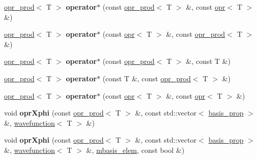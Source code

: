 \begin{DoxyCompactItemize}
\mbox{\label{classqbasis_1_1opr__prod_a9394cae1fbe6e42a475d575ceac997c0}} 
\hyperlink{classqbasis_1_1opr__prod}{opr\+\_\+prod}$<$ T $>$ {\bfseries operator$\ast$} (const \hyperlink{classqbasis_1_1opr__prod}{opr\+\_\+prod}$<$ T $>$ \&, const \hyperlink{classqbasis_1_1opr}{opr}$<$ T $>$ \&)
\item 
\mbox{\label{classqbasis_1_1opr__prod_a9287c2be3de2087fdcced88eb0436490}} 
\hyperlink{classqbasis_1_1opr__prod}{opr\+\_\+prod}$<$ T $>$ {\bfseries operator$\ast$} (const \hyperlink{classqbasis_1_1opr}{opr}$<$ T $>$ \&, const \hyperlink{classqbasis_1_1opr__prod}{opr\+\_\+prod}$<$ T $>$ \&)
\item 
\mbox{\label{classqbasis_1_1opr__prod_a3e2cec7ffd88716c062ccdaef262aaef}} 
\hyperlink{classqbasis_1_1opr__prod}{opr\+\_\+prod}$<$ T $>$ {\bfseries operator$\ast$} (const \hyperlink{classqbasis_1_1opr__prod}{opr\+\_\+prod}$<$ T $>$ \&, const T \&)
\item 
\mbox{\label{classqbasis_1_1opr__prod_a9919cd114d5108bf4eea92e78f7c4827}} 
\hyperlink{classqbasis_1_1opr__prod}{opr\+\_\+prod}$<$ T $>$ {\bfseries operator$\ast$} (const T \&, const \hyperlink{classqbasis_1_1opr__prod}{opr\+\_\+prod}$<$ T $>$ \&)
\item 
\mbox{\label{classqbasis_1_1opr__prod_a11b6241378ef451b125f70513f22fc8c}} 
\hyperlink{classqbasis_1_1opr__prod}{opr\+\_\+prod}$<$ T $>$ {\bfseries operator$\ast$} (const \hyperlink{classqbasis_1_1opr}{opr}$<$ T $>$ \&, const \hyperlink{classqbasis_1_1opr}{opr}$<$ T $>$ \&)
\item 
\mbox{\label{classqbasis_1_1opr__prod_a1fe392ded4e181e14304fd0b5c03e5bf}} 
void {\bfseries opr\+Xphi} (const \hyperlink{classqbasis_1_1opr__prod}{opr\+\_\+prod}$<$ T $>$ \&, const std\+::vector$<$ \hyperlink{classqbasis_1_1basis__prop}{basis\+\_\+prop} $>$ \&, \hyperlink{classqbasis_1_1wavefunction}{wavefunction}$<$ T $>$ \&)
\item 
\mbox{\label{classqbasis_1_1opr__prod_a358a9009899e330604ef5cef110115f2}} 
void {\bfseries opr\+Xphi} (const \hyperlink{classqbasis_1_1opr__prod}{opr\+\_\+prod}$<$ T $>$ \&, const std\+::vector$<$ \hyperlink{classqbasis_1_1basis__prop}{basis\+\_\+prop} $>$ \&, \hyperlink{classqbasis_1_1wavefunction}{wavefunction}$<$ T $>$ \&, \hyperlink{classqbasis_1_1mbasis__elem}{mbasis\+\_\+elem}, const bool \&)

\end{DoxyCompactItemize}
